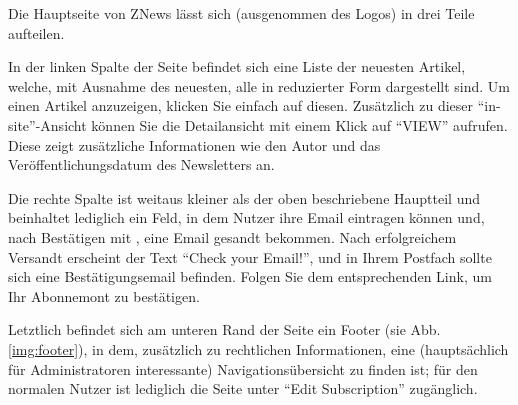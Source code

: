 Die Hauptseite von ZNews lässt sich
(ausgenommen des Logos)
in drei Teile aufteilen.

In der linken Spalte der Seite befindet sich eine Liste
der neuesten Artikel,
welche,
mit Ausnahme des neuesten,
alle in reduzierter Form dargestellt sind.
Um einen Artikel anzuzeigen,
klicken Sie einfach auf diesen.
Zusätzlich zu dieser ``in-site''-Ansicht
können Sie die Detailansicht mit einem Klick auf ``VIEW''
aufrufen.
Diese zeigt zusätzliche Informationen wie den Autor
und das Veröffentlichungsdatum des Newsletters an.

Die rechte Spalte ist weitaus kleiner als der oben beschriebene
Hauptteil und beinhaltet lediglich ein Feld,
in dem Nutzer ihre Email eintragen können und,
nach Bestätigen mit ,
eine Email gesandt bekommen.
Nach erfolgreichem Versandt erscheint der Text
``Check your Email!'',
und in Ihrem Postfach sollte sich eine Bestätigungsemail befinden.
Folgen Sie dem entsprechenden Link,
um Ihr Abonnemont zu bestätigen.

Letztlich befindet sich am unteren Rand der Seite ein Footer
(sie Abb. \ref{img:footer}),
in dem,
zusätzlich zu rechtlichen Informationen,
eine (hauptsächlich für Administratoren interessante)
Navigationsübersicht zu finden ist;
für den normalen Nutzer ist lediglich die Seite
unter ``Edit Subscription'' zugänglich.

